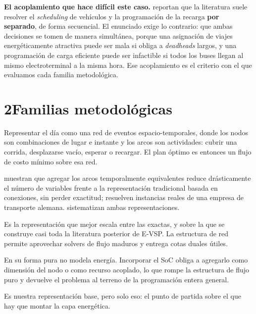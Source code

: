\documentclass[11pt,a4paper,parskip=half]{scrartcl}
\begin{document}
\begin{nota}
\textbf{\textcolor{ink}{El acoplamiento que hace difícil este caso.}} \citet{perumal_evspreview_2022} reportan que la literatura suele resolver el \textit{scheduling} de vehículos y la programación de la recarga \textbf{por separado}, de forma secuencial. El enunciado exige lo contrario: que ambas decisiones se tomen de manera simultánea, porque una asignación de viajes energéticamente atractiva puede ser mala si obliga a \textit{deadheads} largos, y una programación de carga eficiente puede ser infactible si todos los buses llegan al mismo electroterminal a la misma hora. Ese acoplamiento es el criterio con el que evaluamos cada familia metodológica.
\end{nota}

\section*{2\quad Familias metodológicas}

\begin{campos}
\item[En qué consiste] Representar el día como una red de eventos espacio-temporales, donde los nodos son combinaciones de lugar e instante y los arcos son actividades: cubrir una corrida, desplazarse vacío, esperar o recargar. El plan óptimo es entonces un flujo de costo mínimo sobre esa red.
\item[Evidencia] \citet{kliewer_timespacemdvsp_2006} muestran que agregar los arcos temporalmente equivalentes reduce drásticamente el número de variables frente a la representación tradicional basada en conexiones, sin perder exactitud; resuelven instancias reales de una empresa de transporte alemana. \citet{bunte_vspoverview_2009} sistematizan ambas representaciones.
\item[Ventajas] Es la representación que mejor escala entre las exactas, y sobre la que se construye casi toda la literatura posterior de E-VSP. La estructura de red permite aprovechar solvers de flujo maduros y entrega cotas duales útiles.
\item[Desventajas] En su forma pura no modela energía. Incorporar el SoC obliga a agregarlo como dimensión del nodo o como recurso acoplado, lo que rompe la estructura de flujo puro y devuelve el problema al terreno de la programación entera general.
\item[Aplicabilidad] Es nuestra representación base, pero solo eso: el punto de partida sobre el que hay que montar la capa energética.
\end{campos}
\end{document}
